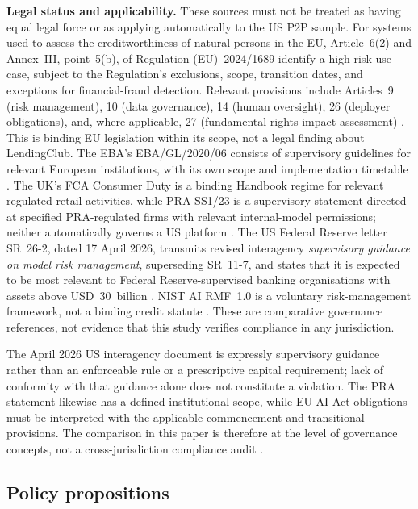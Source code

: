 \documentclass[10pt]{article}
\begin{document}
\noindent\textbf{Legal status and applicability.} These sources must not be treated as having equal legal force or as applying automatically to the US P2P sample. For systems used to assess the creditworthiness of natural persons in the EU, Article~6(2) and Annex~III, point~5(b), of Regulation (EU)~2024/1689 identify a high-risk use case, subject to the Regulation's exclusions, scope, transition dates, and exceptions for financial-fraud detection. Relevant provisions include Articles~9 (risk management), 10 (data governance), 14 (human oversight), 26 (deployer obligations), and, where applicable, 27 (fundamental-rights impact assessment) \cite{ref40}. This is binding EU legislation within its scope, not a legal finding about LendingClub. The EBA's EBA/GL/2020/06 consists of supervisory guidelines for relevant European institutions, with its own scope and implementation timetable \cite{ref44}. The UK's FCA Consumer Duty is a binding Handbook regime for relevant regulated retail activities, while PRA SS1/23 is a supervisory statement directed at specified PRA-regulated firms with relevant internal-model permissions; neither automatically governs a US platform \cite{ref45,ref46}. The US Federal Reserve letter SR~26-2, dated 17 April 2026, transmits revised interagency \emph{supervisory guidance on model risk management}, superseding SR~11-7, and states that it is expected to be most relevant to Federal Reserve-supervised banking organisations with assets above USD~30~billion \cite{ref47}. NIST AI RMF~1.0 is a voluntary risk-management framework, not a binding credit statute \cite{ref39}. These are comparative governance references, not evidence that this study verifies compliance in any jurisdiction.

The April 2026 US interagency document is expressly supervisory guidance rather than an enforceable rule or a prescriptive capital requirement; lack of conformity with that guidance alone does not constitute a violation. The PRA statement likewise has a defined institutional scope, while EU AI Act obligations must be interpreted with the applicable commencement and transitional provisions. The comparison in this paper is therefore at the level of governance concepts, not a cross-jurisdiction compliance audit \cite{ref40,ref45,ref47}.


\subsection{Policy propositions}
\end{document}
